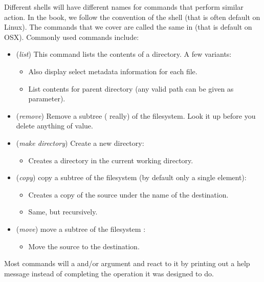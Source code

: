 Different shells will have different names for commands that perform similar action. In the book, we follow the convention of the  shell (that is often default on Linux). The commands that we cover are called the same in  (that is default on OSX). Commonly used commands include:
\begin{itemize}
  \item {} (\textsl{list}) This command lists the contents of a directory. A few variants:
    \begin{itemize}
      \item {} Also display select metadata information for each file.
      \item {} List contents for parent directory (any valid path can be given as parameter).
    \end{itemize}
  \item {} (\textsl{remove}) Remove a subtree ( really) of the filesystem. Look it up before you delete anything of value.
  \item {} (\textsl{make directory}) Create a new directory:
    \begin{itemize}
      \item {} Creates a directory in the current working directory.
    \end{itemize}
  \item {} (\textsl{copy}) copy a subtree of the filesystem (by default only a single element):
    \begin{itemize}
      \item {} Creates a copy of the source under the name of the destination.
      \item {} Same, but recursively.
    \end{itemize}
  \item {} (\textsl{move}) move a subtree of the filesystem :
    \begin{itemize}
      \item {} Move the source to the destination.
    \end{itemize}
\end{itemize}

Most commands will  a  and/or  argument and react to it by printing out a help message instead of completing the operation it was designed to do.

